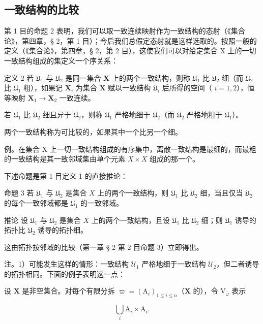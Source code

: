 \subsection{一致结构的比较}

第 1 目的命题 2 表明，我们可以取一致连续映射作为一致结构的态射（《集合论》，第四章，§ 2，第 1 目）；今后我们总假定态射就是这样选取的。按照一般的定义（《集合论》，第四章，§ 2，第 2 目），这使我们可以对给定集合 X 上的一切一致结构组成的集定义一个序关系：

定义 2 若 \(\mathfrak{U}_1\) 与 \(\mathfrak{U}_2\) 是同一集合 \(\mathbf{X}\) 上的两个一致结构，则称 \(\mathfrak{U}_1\) 比 \(\mathfrak{U}_2\) 细（而 \(\mathfrak{U}_2\) 比 \(\mathfrak{U}_1\) 粗），如果记 \(\mathbf{X}_i\) 为集合 \(\mathbf{X}\) 赋以一致结构 \(\mathfrak{U}_i\) 后所得的空间（ \(i = 1,2\)），恒等映射 \(\mathbf{X}_1 \to \mathbf{X}_2\) 一致连续。

若 \(\mathfrak{U}_1\) 比 \(\mathfrak{U}_2\) 细且异于 \(\mathfrak{U}_2\)，则称 \(\mathfrak{U}_1\) 严格地细于 \(\mathfrak{U}_2\)（而 \(\mathfrak{U}_2\) 严格地粗于 \(\mathfrak{U}_1\)）。

两个一致结构称为可比较的，如果其中一个比另一个细。

例。在集合 X 上一切一致结构组成的有序集中，离散一致结构是最细的，而最粗的一致结构是其一致邻域集由单个元素 \(X \times X\) 组成的那一个。

下述命题是第 1 目定义 1 的直接推论：

命题 3 若 \(\mathfrak{U}_1\) 与 \(\mathfrak{U}_2\) 是集合 \(X\) 上的两个一致结构，则 \(\mathfrak{U}_1\) 比 \(\mathfrak{U}_2\) 细，当且仅当 \(\mathfrak{U}_2\) 的每个一致邻域都是 \(\mathfrak{U}_1\) 的一致邻域。

推论 设 \(\mathfrak{U}_1\) 与 \(\mathfrak{U}_2\) 是集合 \(X\) 上的两个一致结构，且设 \(\mathfrak{U}_1\) 比 \(\mathfrak{U}_2\) 细；则 \(\mathfrak{U}_1\) 诱导的拓扑比 \(\mathfrak{U}_2\) 诱导的拓扑细。

这由拓扑按邻域的比较（第一章 § 2 第 2 目命题 3）立即得出。

注。1）可能发生这样的情形：一致结构 \(\mathcal{U}_1\) 严格地细于一致结构 \(\mathcal{U}_2\)，但二者诱导的拓扑相同。下面的例子表明这一点：

设 \(\mathbf{X}\) 是非空集合。对每个有限分拆 \(\varpi = (\mathrm{A}_i)_{1\leqslant i\leqslant n}\)（\(\mathbf{X}\) 的），令 \(\mathrm{V}_{\overline{\omega}}\) 表示

\[
\bigcup_ {i} \mathrm{A} _ {i} \times \mathrm{A} _ {i}.
\]

